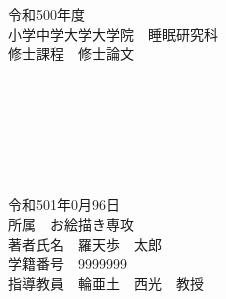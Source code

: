 \documentclass[main]{subfiles}
\begin{document}
\thispagestyle{empty}
\begin{center}

  \vspace{20mm}
  {\Large\noindent 令和500年度}\\
  \vspace{\baselineskip}
  {\Large\noindent 小学中学大学大学院　睡眠研究科}\\
  \vspace{\baselineskip}
  {\Large\noindent 修士課程　修士論文}\\
  \vspace{20mm}
  {\huge{}}\\
  \medskip
  {\huge\noindent{\LaTeX}}\\
  \medskip
  {\huge{}}\\
  \vspace{\baselineskip}
  {\huge{}}\\
  \medskip
  {\huge\noindent{\LaTeX}}\\
  \medskip
  {\huge{}}\\
  \vspace{20mm}

  {\Large\noindent
    令和501年0月96日\\
    \vspace{\baselineskip}
    所属　お絵描き専攻\\
    \vspace{\baselineskip}
    著者氏名　羅天歩　太郎\\
    \vspace{\baselineskip}
    学籍番号　9999999\\
    \vspace{\baselineskip}
    指導教員　輪亜土　西光　教授   \\
  }
  \vspace{40mm}

\end{center}

\thispagestyle{empty}
\clearpage
\end{document}
